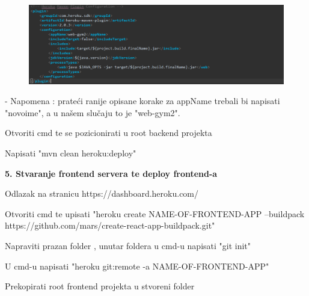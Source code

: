 \begin{packed_item}
\begin{packed_enum}
							    \begin{figure}[H]
                        			\hspace*{-1.5cm}
                        			\includegraphics[scale=0.5]{slike/plugin.PNG} %
                        			\centering
                        			\label{fig:promjene}
                        		\end{figure}
                        		
                        		- Napomena : prateći ranije opisane korake za appName trebali bi napisati
                        		"novoime", a u našem slučaju to je "web-gym2".
							
							\item Otvoriti cmd te se pozicionirati u root backend projekta
							
							\item Napisati "mvn clean heroku:deploy"
						

						\end{packed_enum}
						
				\item  \textbf{5. Stvaranje frontend servera te deploy frontend-a}
				\item[] \begin{packed_enum}
	
							\item Odlazak na stranicu  https://dashboard.heroku.com/
							
							\item Otvoriti cmd te upisati "heroku create NAME-OF-FRONTEND-APP --buildpack https://github.com/mars/create-react-app-buildpack.git"

							\item Napraviti prazan folder , unutar foldera u cmd-u napisati "git init"
							
							\item U cmd-u napisati "heroku git:remote -a NAME-OF-FRONTEND-APP"
							
							\item Prekopirati root frontend projekta u stvoreni folder
							

\end{packed_enum}
\end{packed_item}

